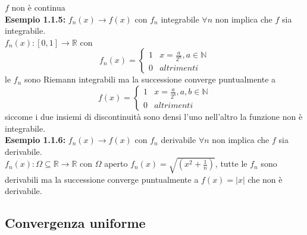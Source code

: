\documentclass[a4paper,11pt,titlepage]{book}
\begin{document}
$f$ non è continua \\

\textbf{Esempio 1.1.5:} $f_{n}(x)\to f(x)$ con $f_n$ integrabile $ \forall n$ non implica che $f$ sia integrabile.\\ 

$f_{n}(x):[0,1]\rightarrow\mathbb{R}$ con $$f_{n}(x)=
\begin{cases}
 1 &  x=\frac{a}{2^n}, a\in \mathbb{N}  \\ 
0 & altrimenti
\end{cases}$$
le $f_n$ sono Riemann integrabili ma la successione converge puntualmente a 
$$f(x)=
\begin{cases}
 1 &  x=\frac{a}{2^b}, a,b\in \mathbb{N}  \\ 
0 & altrimenti
\end{cases}$$
siccome i due insiemi di discontinuità sono densi l'uno nell'altro la funzione non è integrabile.\\

\textbf{Esempio 1.1.6:} $f_{n}(x)\to f(x)$ con $f_n$ derivabile $ \forall n$ non implica che $f$ sia derivabile.\\

$f_{n}(x):\Omega\subseteq\mathbb{R}\rightarrow\mathbb{R}$ con $\Omega$ aperto $f_{n}(x)=\sqrt{(x^2+\frac{1}{n})}$, tutte le $f_n$ sono derivabili ma la successione converge puntualmente a $f(x)=|x|$ che non è derivabile.

\begin{center}
      \end{center}

\subsection{Convergenza uniforme}
\end{document}
